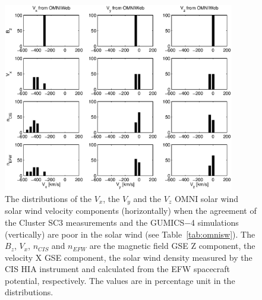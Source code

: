 \documentclass[linenumbers,draft]{agujournal}
\begin{document}
\begin{figure}[h]
\centering
\includegraphics[width=0.9\textwidth,angle=0]{swe-2020-corr-f15.eps}  
\caption{The distributions of the $V_{x}$, the $V_{y}$ and the $V_{z}$ OMNI solar wind solar wind velocity components (horizontally) when the agreement of the Cluster SC3 measurements and the GUMICS$-$4 simulations (vertically) are poor in the solar wind (see Table~\ref{tab:omnisw}). The $B_{z}$, $V_{x}$, $n_{CIS}$ and $n_{EFW}$ are the magnetic field GSE Z component, the velocity X GSE component, the solar wind density measured by the CIS HIA instrument and calculated from the EFW spacecraft potential, respectively. The values are in percentage unit in the distributions.}
\label{fig:swomnivxyz}
\end{figure}

\pagebreak
\end{document}
